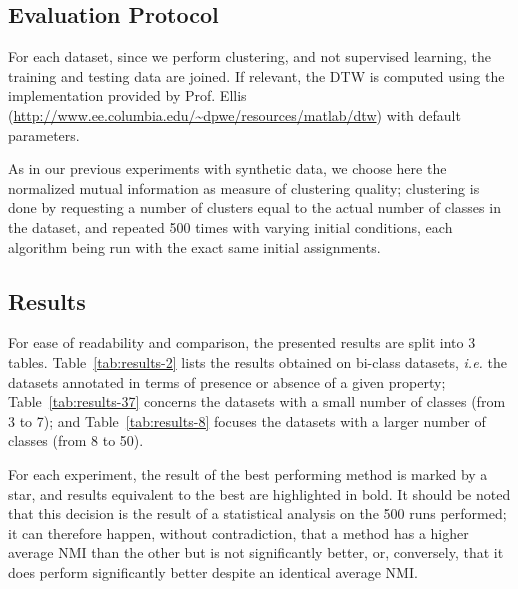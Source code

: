 \documentclass[a4paper,twoside]{article}
\begin{document}
\subsection{Evaluation Protocol}

For each dataset, since we perform clustering, and not supervised learning, the training and testing data are joined. If relevant, the DTW is computed using the implementation provided by Prof. Ellis (\url{http://www.ee.columbia.edu/~dpwe/resources/matlab/dtw}) with default parameters.

As in our previous experiments with synthetic data, we choose here the normalized mutual information as measure of clustering quality; clustering is done by requesting a number of clusters equal to the actual number of classes in the dataset, and repeated 500 times with varying initial conditions, each algorithm being run with the exact same initial assignments.

\subsection{Results}

For ease of readability and comparison, the presented results are split into 3 tables. Table~\ref{tab:results-2} lists the results obtained on bi-class datasets, \textit{i.e.} the datasets annotated in terms of presence or absence of a given property; Table~\ref{tab:results-37} concerns the datasets with a small number of classes (from 3 to 7); and Table~\ref{tab:results-8} focuses the datasets with a larger number of classes (from 8 to 50).

For each experiment, the result of the best performing method is marked by a star, and results equivalent to the best are highlighted in bold. It should be noted that this decision is the result of a statistical analysis on the 500 runs performed; it can therefore happen, without contradiction, that a method has a higher average NMI than the other but is not significantly better, or, conversely, that it does perform significantly better despite an identical average NMI.

\end{document}
